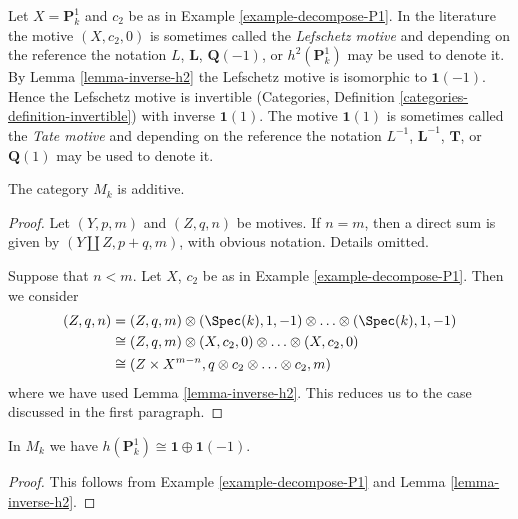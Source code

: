 \begin{remark}
\label{remark-lefschetz-tate}
Let $X = \mathbf{P}^1_k$ and $c_2$ be as in Example \ref{example-decompose-P1}.
In the literature the motive $(X, c_2, 0)$ is sometimes called the
{\it Lefschetz motive} and depending on the reference the notation
$L$, $\mathbf{L}$, $\mathbf{Q}(-1)$, or $h^2(\mathbf{P}^1_k)$
may be used to denote it. By Lemma \ref{lemma-inverse-h2} the Lefschetz motive
is isomorphic to $\mathbf{1}(-1)$. Hence the Lefschetz motive is
invertible (Categories, Definition \ref{categories-definition-invertible})
with inverse
$\mathbf{1}(1)$. The motive $\mathbf{1}(1)$ is sometimes called the
{\it Tate motive} and depending on the reference the notation
$L^{-1}$, $\mathbf{L}^{-1}$, $\mathbf{T}$, or $\mathbf{Q}(1)$ may
be used to denote it.
\end{remark}

\begin{lemma}
\label{lemma-additive}
The category $M_k$ is additive.
\end{lemma}

\begin{proof}
Let $(Y, p, m)$ and $(Z, q, n)$ be motives. If $n = m$, then a
direct sum is given by $(Y \amalg Z, p + q, m)$, with obvious notation.
Details omitted.

\medskip\noindent
Suppose that $n < m$. Let $X$, $c_2$ be as in
Example \ref{example-decompose-P1}. Then we consider
\begin{align*}
(Z, q, n)
& =
(Z, q, m) \otimes (\Spec(k), 1, -1) \otimes \ldots \otimes
(\Spec(k), 1, -1) \\
& \cong
(Z, q, m) \otimes (X, c_2, 0) \otimes \ldots \otimes (X, c_2, 0) \\
& \cong
(Z \times X^{m - n}, q \otimes c_2 \otimes \ldots \otimes c_2, m)
\end{align*}
where we have used Lemma \ref{lemma-inverse-h2}.
This reduces us to the case discussed in the first paragraph.
\end{proof}

\begin{lemma}
\label{lemma-decompose-P1}
In $M_k$ we have $h(\mathbf{P}^1_k) \cong \mathbf{1} \oplus \mathbf{1}(-1)$.
\end{lemma}

\begin{proof}
This follows from Example \ref{example-decompose-P1} and
Lemma \ref{lemma-inverse-h2}.
\end{proof}

